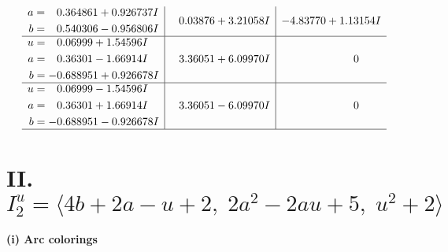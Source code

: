 \documentclass[1p]{elsarticle_modified}
\theoremstyle{definition}
\begin{document}
$$\begin{array}{c|c|c}
\begin{aligned}
a &= \phantom{-}0.364861 + 0.926737 I \\
b &= \phantom{-}0.540306 - 0.956806 I\end{aligned}
 & \phantom{-}0.03876 + 3.21058 I & -4.83770 + 1.13154 I \\ \hline\begin{aligned}
u &= \phantom{-}0.06999 + 1.54596 I \\
a &= \phantom{-}0.36301 - 1.66914 I \\
b &= -0.688951 + 0.926678 I\end{aligned}
 & \phantom{-}3.36051 + 6.09970 I & \phantom{-0.000000 } 0 \\ \hline\begin{aligned}
u &= \phantom{-}0.06999 - 1.54596 I \\
a &= \phantom{-}0.36301 + 1.66914 I \\
b &= -0.688951 - 0.926678 I\end{aligned}
 & \phantom{-}3.36051 - 6.09970 I & \phantom{-0.000000 } 0\\
 \hline 
 \end{array}$$\newpage\newpage\renewcommand{\arraystretch}{1}
\centering \section*{II. $I^u_{2}= \langle 4 b+2 a- u+2,\;2 a^2-2 a u+5,\;u^2+2 \rangle$}
\flushleft \textbf{(i) Arc colorings}\\
\end{document}
